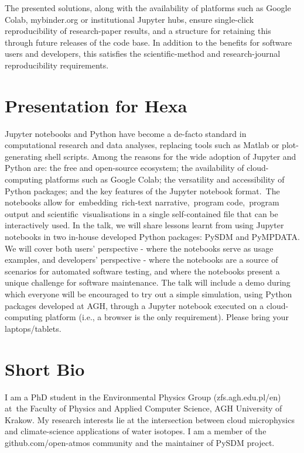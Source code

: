 \documentclass[12pt]{article}
\begin{document}

The presented solutions, along with the availability of platforms such as Google Colab, mybinder.org or institutional Jupyter hubs, ensure single-click 
reproducibility of research-paper results, and a structure for retaining this through future releases of the code base.
In addition to the benefits for software users and developers, this satisfies the scientific-method and research-journal reproducibility requirements.

\section{Presentation for Hexa}

Jupyter notebooks and Python have become a de-facto standard in computational research and data analyses, replacing tools such as Matlab or plot-generating shell scripts. Among the reasons for the wide adoption of Jupyter and Python are: the free and open-source ecosystem; the availability of cloud-computing platforms such as Google Colab; the versatility and accessibility of Python packages; and the key features of the Jupyter notebook format. The notebooks allow for embedding rich-text narrative, program code, program output and scientific visualisations in a single self-contained file that can be interactively used. In the talk, we will share lessons learnt from using Jupyter notebooks in two in-house developed Python packages: PySDM and PyMPDATA. We will cover both users' perspective - where the notebooks serve as usage examples, and developers' perspective - where the notebooks are a source of scenarios for automated software testing, and where the notebooks present a unique challenge for software maintenance. The talk will include a demo during which everyone will be encouraged to try out a simple simulation, using Python packages developed at AGH, through a Jupyter notebook executed on a cloud-computing platform (i.e., a browser is the only requirement). Please bring your laptops/tablets. 


\section*{Short Bio}
I am a PhD student in the Environmental Physics Group (zfs.agh.edu.pl/en) at~the Faculty of Physics and Applied Computer Science, AGH University of Krakow. My research interests lie at the intersection between cloud microphysics and climate-science applications of water isotopes. I am a member of the github.com/open-atmos community and the maintainer of PySDM project.
\end{document}
